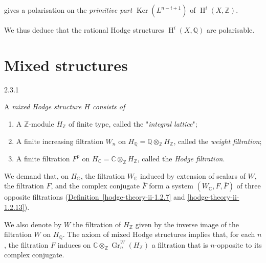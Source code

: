     gives a polarisation on the \emph{primitive part} \(\operatorname {Ker}(L^{n-i+1})\) of \(\operatorname {H}^i(X,\mathbb {Z})\).\par{}We thus deduce that the rational Hodge structures \(\operatorname {H}^i(X,\mathbb {Q})\) are polarisable.\section{Mixed structures}\label{hodge-theory-ii-2.3}\begin{definition}{2.3.1}\label{hodge-theory-ii-2.3.1}\skipsinglepar\par{}A \emph{mixed Hodge structure \(H\) consists of}

    
 \begin{enumerate}
      
 \item[(a)]
        A \(\mathbb {Z}\)-module \(H_\mathbb {Z}\) of finite type, called the "\emph{integral lattice}";
      

      
 \item[(b)]
        A finite increasing filtration \(W_n\) on \(H_\mathbb {Q}=\mathbb {Q}\otimes _\mathbb {Z} H_\mathbb {Z}\), called the \emph{weight filtration};
      

      
 \item[(c)]
        A finite filtration \(F^p\) on \(H_\mathbb {C}=\mathbb {C}\otimes _\mathbb {Z} H_\mathbb {Z}\), called the \emph{Hodge filtration}.
      

    \end{enumerate}


    We demand that, on \(H_\mathbb {C}\), the filtration \(W_\mathbb {C}\) induced by extension of scalars of \(W\), the filtration \(F\), and the complex conjugate \(\overline {F}\) form a system \((W_\mathbb {C},F,\overline {F})\) of three opposite filtrations (\hyperref[hodge-theory-ii-1.2.7]{Definition~\ref*{hodge-theory-ii-1.2.7}} and \cref{hodge-theory-ii-1.2.13}).\end{definition}\label{hodge-theory-ii-2.3.2}\par{}We also denote by \(W\) the filtration of \(H_\mathbb {Z}\) given by the inverse image of the filtration \(W\) on \(H_\mathbb {Q}\).
    The axiom of mixed Hodge structures implies that, for each \(n\), the filtration \(F\) induces on \(\mathbb {C}\otimes _\mathbb {Z}\operatorname {Gr}_n^W(H_\mathbb {Z})\) a filtration that is \(n\)-opposite to its complex conjugate.
